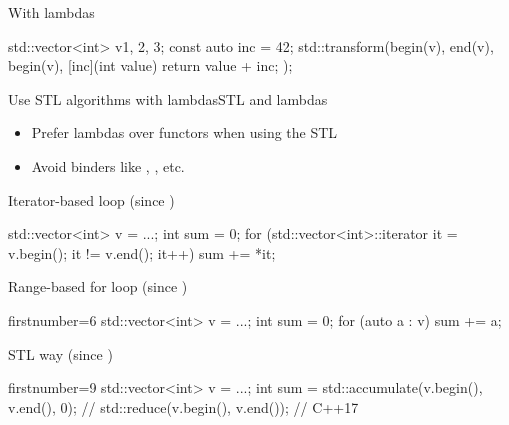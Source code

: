 \begin{frame}[fragile]
  \begin{exampleblock}{With lambdas}
    \begin{cppcode*}{}
      std::vector<int> v{1, 2, 3};
      const auto inc = 42;
      std::transform(begin(v), end(v), begin(v),
                     [inc](int value) {
                       return value + inc;
                     });
    \end{cppcode*}
  \end{exampleblock}
  \pause
  \begin{goodpracticeWithShortcut}{Use STL algorithms with lambdas}{STL and lambdas}
    \begin{itemize}
      \item Prefer lambdas over functors when using the STL
      \item Avoid binders like , , etc.
    \end{itemize}
  \end{goodpracticeWithShortcut}
\end{frame}

\begin{frame}[fragile]
  \begin{block}{Iterator-based loop (since )}
    \begin{cppcode*}{}
      std::vector<int> v = ...;
      int sum = 0;
      for (std::vector<int>::iterator it = v.begin();
           it != v.end(); it++)
        sum += *it;
    \end{cppcode*}
  \end{block}
  \pause
  \begin{block}{Range-based for loop (since )}
    \begin{cppcode*}{firstnumber=6}
      std::vector<int> v = ...;
      int sum = 0;
      for (auto a : v) { sum += a; }
    \end{cppcode*}
  \end{block}
  \pause
  \begin{exampleblock}{STL way (since )}
    \begin{cppcode*}{firstnumber=9}
      std::vector<int> v = ...;
      int sum = std::accumulate(v.begin(), v.end(), 0);
      // std::reduce(v.begin(), v.end()); // C++17
    \end{cppcode*}
  \end{exampleblock}
\end{frame}

